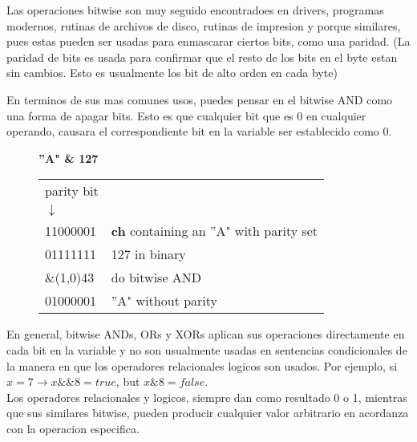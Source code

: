 \documentclass[]{article}
\begin{document}
			Las operaciones bitwise son muy seguido encontradoes en drivers, programas modernos, rutinas de archivos de disco, rutinas de impresion y porque similares, pues estas pueden ser usadas para enmascarar ciertos bits, como una paridad. (La paridad de bits es usada para confirmar que el resto de los bits en el byte estan sin cambios. Esto es usualmente los bit de alto orden en cada byte)
			
			En terminos de sus mas comunes usos, puedes pensar en el bitwise AND como una forma de apagar bits. Esto es que cualquier bit que es 0 en cualquier operando, causara el correspondiente bit en la variable ser establecido como 0.
			
			\clearpage
			
			\begin{figure}[!h]
					\begin{center}
						\large{\textbf{''A" \& 127}} \\
						\begin{tabular}{|l l|}
							\hline
							\hspace{7pt}parity bit & \\
							\hspace{7pt}$\downarrow$ & \\
							\hspace{7pt}11000001 & 
							\hspace{7pt}\textbf{ch} containing an ''A" with parity set\\
							\hspace{7pt}01111111 & 127 in binary\\
							\&\line(1,0){43} & do bitwise AND\\
							\hspace{8pt}01000001 & ''A" without parity\\
							\hline
						\end{tabular}
					\end{center}
			\end{figure}
		
			En general, bitwise ANDs, ORs y XORs aplican sus operaciones directamente en cada bit en la variable y no son usualmente usadas en sentencias condicionales de la manera en que los operadores relacionales logicos son usados. Por ejemplo, si $x=7 \rightarrow x\&\&8=true$, but $x\&8=false$.\\
			
			Los operadores relacionales y logicos, siempre dan como resultado 0 o 1, mientras que sus similares bitwise, pueden producir cualquier valor arbitrario en acordanza con la operacion especifica.\\
			
\end{document}
